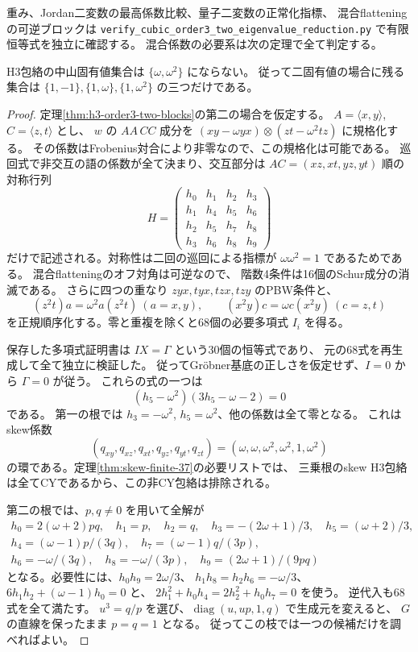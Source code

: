 重み、Jordan二変数の最高係数比較、量子二変数の正常化指標、
混合flatteningの可逆ブロックは
\texttt{verify\_\allowbreak{}cubic\_\allowbreak{}order3\_\allowbreak{}two\_\allowbreak{}eigenvalue\_\allowbreak{}reduction.py}
で有限恒等式を独立に確認する。
混合係数の必要系は次の定理で全て判定する。

\begin{theorem}[二つの非自明三乗根固有値の全排除]
\label{thm:h3-order3-two-nontrivial-excluded}
H3包絡の中山固有値集合は $\{\omega,\omega^2\}$ にならない。
従って二固有値の場合に残る集合は
$\{1,-1\},\{1,\omega\},\{1,\omega^2\}$ の三つだけである。
\end{theorem}
\begin{proof}
定理\ref{thm:h3-order3-two-blocks}の第二の場合を仮定する。
$A=\langle x,y\rangle$, $C=\langle z,t\rangle$ とし、
$w$ の $AA\,CC$ 成分を $(xy-\omega yx)\otimes(zt-\omega^2tz)$ に規格化する。
その係数はFrobenius対合により非零なので、この規格化は可能である。
巡回式で非交互の語の係数が全て決まり、交互部分は
$AC=(xz,xt,yz,yt)$ 順の対称行列
\[
 H=\begin{pmatrix}
 h_0&h_1&h_2&h_3\\h_1&h_4&h_5&h_6\\
 h_2&h_5&h_7&h_8\\h_3&h_6&h_8&h_9
 \end{pmatrix}
\]
だけで記述される。対称性は二回の巡回による指標が $\omega\omega^2=1$ であるためである。
混合flatteningのオフ対角は可逆なので、
階数4条件は16個のSchur成分の消滅である。
さらに四つの重なり $zyx,tyx,tzx,tzy$ のPBW条件と、
\[
 (z^2t)a=\omega^2a(z^2t)\ (a=x,y),\qquad
 (x^2y)c=\omega c(x^2y)\ (c=z,t)
\]
を正規順序化する。零と重複を除くと68個の必要多項式 $I_i$ を得る。

保存した多項式証明書は $I X=\Gamma$ という30個の恒等式であり、
元の68式を再生成して全て独立に検証した。
従ってGr\"obner基底の正しさを仮定せず、$I=0$ から $\Gamma=0$ が従う。
これらの式の一つは
\[
 (h_5-\omega^2)(3h_5-\omega-2)=0
\]
である。
第一の根では $h_3=-\omega^2$, $h_5=\omega^2$、他の係数は全て零となる。
これはskew係数
\[
 (q_{xy},q_{xz},q_{xt},q_{yz},q_{yt},q_{zt})
 =(\omega,\omega,\omega^2,\omega^2,1,\omega^2)
\]
の環である。定理\ref{thm:skew-finite-37}の必要リストでは、
三乗根のskew H3包絡は全てCYであるから、この非CY包絡は排除される。

第二の根では、$p,q\ne0$ を用いて全解が
\[
\begin{gathered}
 h_0=2(\omega+2)pq,\quad h_1=p,\quad h_2=q,\quad
 h_3=-(2\omega+1)/3,\quad h_5=(\omega+2)/3,\\
 h_4=(\omega-1)p/(3q),\quad h_7=(\omega-1)q/(3p),\\
 h_6=-\omega/(3q),\quad h_8=-\omega/(3p),\quad
 h_9=(2\omega+1)/(9pq)
\end{gathered}
\]
となる。必要性には、$h_0h_9=2\omega/3$、
$h_1h_8=h_2h_6=-\omega/3$、
$6h_1h_2+(\omega-1)h_0=0$ と、
$2h_1^2+h_0h_4=2h_2^2+h_0h_7=0$ を使う。
逆代入も68式を全て満たす。
$u^3=q/p$ を選び、$\operatorname{diag}(u,up,1,q)$ で生成元を変えると、
$G$ の直線を保ったまま $p=q=1$ となる。
従ってこの枝では一つの候補だけを調べればよい。


\end{proof}
